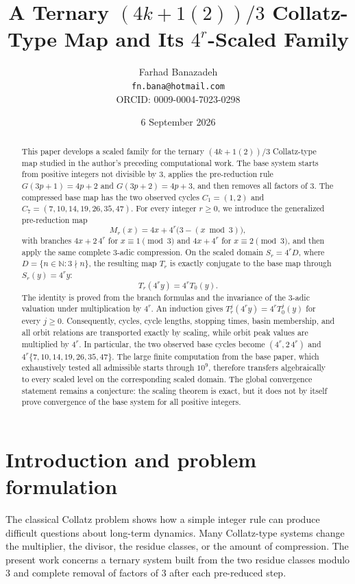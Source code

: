 \documentclass[11pt]{article}
\title{A Ternary $(4k+1(2))/3$ Collatz-Type Map and Its $4^r$-Scaled Family}
\author{Farhad Banazadeh\\\texttt{fn.bana@hotmail.com}\\ORCID: 0009-0004-7023-0298}
\date{6 September 2026}
\begin{document}
\maketitle

\begin{abstract}
This paper develops a scaled family for the ternary $(4k+1(2))/3$ Collatz-type map studied in the author's preceding computational work. The base system starts from positive integers not divisible by $3$, applies the pre-reduction rule $G(3p+1)=4p+2$ and $G(3p+2)=4p+3$, and then removes all factors of $3$. The compressed base map has the two observed cycles $C_1=(1,2)$ and $C_7=(7,10,14,19,26,35,47)$. For every integer $r\ge0$, we introduce the generalized pre-reduction map
\[
M_r(x)=4x+4^r\bigl(3-(x\bmod 3)\bigr),
\]
with branches $4x+2\,4^r$ for $x\equiv1\pmod3$ and $4x+4^r$ for $x\equiv2\pmod3$, and then apply the same complete $3$-adic compression. On the scaled domain $S_r=4^rD$, where $D=\{n\in\mathbb N:3\nmid n\}$, the resulting map $T_r$ is exactly conjugate to the base map through $S_r(y)=4^ry$:
\[
T_r(4^ry)=4^rT_0(y).
\]
The identity is proved from the branch formulas and the invariance of the $3$-adic valuation under multiplication by $4^r$. An induction gives $T_r^j(4^ry)=4^rT_0^j(y)$ for every $j\ge0$. Consequently, cycles, cycle lengths, stopping times, basin membership, and all orbit relations are transported exactly by scaling, while orbit peak values are multiplied by $4^r$. In particular, the two observed base cycles become $(4^r,2\,4^r)$ and $4^r\{7,10,14,19,26,35,47\}$. The large finite computation from the base paper, which exhaustively tested all admissible starts through $10^9$, therefore transfers algebraically to every scaled level on the corresponding scaled domain. The global convergence statement remains a conjecture: the scaling theorem is exact, but it does not by itself prove convergence of the base system for all positive integers.
\end{abstract}

\section{Introduction and problem formulation}
The classical Collatz problem shows how a simple integer rule can produce difficult questions about long-term dynamics. Many Collatz-type systems change the multiplier, the divisor, the residue classes, or the amount of compression. The present work concerns a ternary system built from the two residue classes modulo $3$ and complete removal of factors of $3$ after each pre-reduced step.
\end{document}
